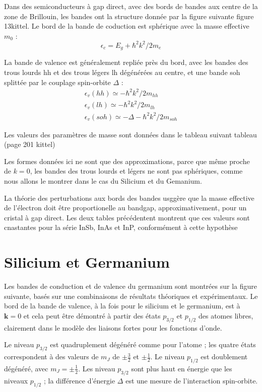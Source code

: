 Dans des semiconducteurs à gap direct, avec des bords de bandes aux centre de la
zone de Brillouin, les bandes ont la structure donnée par la figure suivante
\TODO figure 13kittel. Le bord de la bande de coduction est sphérique avec la
masse effective $m_0$ :
\begin{equation}
    \epsilon_c = E_g + \hbar^2 k^2 / 2m_e
\end{equation}

La bande de valence est généralement repliée près du bord, avec les bandes des
trous lourds hh et des trous légers lh dégénérées au centre, et une bande soh
splittée par le couplage spin-orbite $\Delta$ :
\begin{eqnarray}
    \epsilon_v(hh) \simeq -\hbar^2 k^2/2m_{hh}\\
    \epsilon_v(lh) \simeq -\hbar^2 k^2/2m_{lh}\\
    \epsilon_v(soh) \simeq - \Delta - \hbar^2 k^2/2m_{soh}
\end{eqnarray}

Les valeurs des paramètres de masse sont données dans le tableau suivant
\TODO tableau (page 201 kittel)

Les formes données ici ne sont que des approximations, parce que même proche de
$k = 0$, les bandes des trous lourds et légers ne sont pas sphériques, comme nous
allons le montrer dans le cas du Silicium et du Gemanium.

La théorie des perturbations aux bords des bandes usggère que la masse effective
de l'électron doit être proportionelle au bandgap, approximativement, pour un
cristal à gap direct. Les deux tables précédentent montrent que ces valeurs sont
cnastantes pour la série InSb, InAs et InP, conformément à cette hypothèse

\section{Silicium et Germanium}

Les bandes de conduction et de valence du germanium sont montrées sur la figure
suivante, basés sur une combinaisons de résultats théoriques et expérimentaux. Le
bord de la bande de valence, à la fois pour le silicium et le germanium, est à
$\mathbf{k}=0$ et cela peut être démontré à partir des états $p_{3/2}$ et
$p_{1/2}$ des atomes libres, clairement dans le modèle des liaisons fortes pour
les fonctions d'onde.

Le niveau $p_{3/2}$ est quadruplement dégénéré comme pour l'atome ; les quatre
états correspondent à des valeurs de $m_J$ de $\pm \frac{3}{2}$ et $\pm
\frac{1}{2}$. Le niveau $p_{1/2}$ est doublement dégénéré, avec $m_J = \pm
\frac{1}{2}$. Les niveau $p_{3/2}$ sont plus haut en énergie que les niveaux
$p_{1/2}$ ; la différence d'énergie $\Delta$ est une mesure de l'interaction
spin-orbite.

